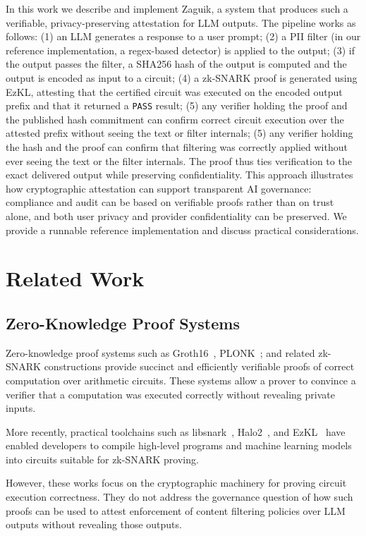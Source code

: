 \documentclass[10pt,conference,a4paper]{IEEEtran}
\begin{document}
In this work we describe and implement Zaguik, a system that produces such a verifiable, privacy-preserving attestation for LLM outputs. The pipeline works as follows: (1) an LLM generates a response to a user prompt; (2) a PII filter (in our reference implementation, a regex-based detector) is applied to the output; (3) if the output passes the filter, a SHA256 hash of the output is computed and the output is encoded as input to a circuit; (4) a zk-SNARK proof is generated using EzKL, attesting that the certified circuit was executed on the encoded output prefix and that it returned a \texttt{PASS} result; (5) any verifier holding the proof and the published hash commitment can confirm correct circuit execution over the attested prefix without seeing the text or filter internals; (5) any verifier holding the hash and the proof can confirm that filtering was correctly applied without ever seeing the text or the filter internals. The proof thus ties verification to the exact delivered output while preserving confidentiality. This approach illustrates how cryptographic attestation can support transparent AI governance: compliance and audit can be based on verifiable proofs rather than on trust alone, and both user privacy and provider confidentiality can be preserved. We provide a runnable reference implementation and discuss practical considerations.


\section{Related Work}
\subsection{Zero-Knowledge Proof Systems}

Zero-knowledge proof systems such as Groth16~\cite{groth2016size}, PLONK~\cite{gabizon2019plonk}; and related zk-SNARK constructions provide succinct and efficiently verifiable proofs of correct computation over arithmetic circuits. These systems allow a prover to convince a verifier that a computation was executed correctly without revealing private inputs.

More recently, practical toolchains such as libsnark~\cite{bensasson2014vn}, Halo2~\cite{halo2}, and EzKL~\cite{ezkl} have enabled developers to compile high-level programs and machine learning models into circuits suitable for zk-SNARK proving.

However, these works focus on the cryptographic machinery for proving circuit execution correctness. They do not address the governance question of how such proofs can be used to attest enforcement of content filtering policies over LLM outputs without revealing those outputs.
\end{document}
